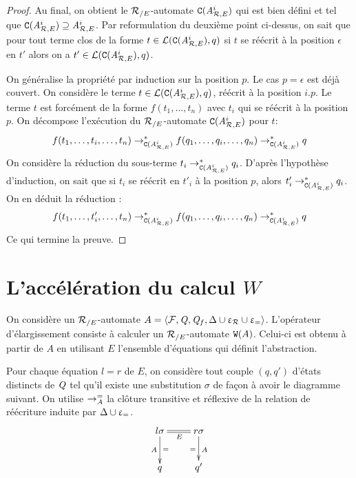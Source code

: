 \begin{proof}
  
  Au final, on obtient le ${\mathcal R_{/E}}$-automate $\mathtt{C}({\mathit A}_{\mathcal R,E}^i)$ qui est bien défini et tel que $\mathtt{C}({\mathit A}_{\mathcal R,E}^i) \supseteq {\mathit A}_{\mathcal R,E}^i$.
  Par reformulation du deuxième point ci-dessus, on sait que pour tout terme clos de la forme $t \in \mathcal{L}(\mathtt{C}({\mathit A}_{\mathcal R,E}^i),q)$ si $t$ se réécrit à la position $\epsilon$
  en $t'$ alors on a $t' \in \mathcal{L}(\mathtt{C}({\mathit A}_{\mathcal R,E}^i),q)$.

  On généralise la propriété par induction sur la position $p$. Le cas $p = \epsilon$ est déjà couvert.
  On considère le terme $t \in \mathcal{L}(\mathtt{C}({\mathit A}_{\mathcal R,E}^i),q)$, réécrit à la position $i.p$. Le terme $t$
  est forcément de la forme $f(t_1, \dots, t_n)$ avec $t_i$ qui se réécrit à la position $p$.
  On décompose l'exécution du ${\mathcal R_{/E}}$-automate $\mathtt{C}({\mathit A}_{\mathcal R,E}^i)$ pour $t$:
  \[ f(t_1, \dots,t_i, \dots,t_n) \rightarrow^*_{\mathtt{C}({\mathit A}_{\mathcal R,E}^i)} f(q_1, \dots,q_i, \dots,q_n) \rightarrow^*_{\mathtt{C}({\mathit A}_{\mathcal R,E}^i)} q \]
  On considère la réduction du sous-terme $t_i \rightarrow^*_{\mathtt{C}({\mathit A}_{\mathcal R,E}^i)} q_i$. D'après l'hypothèse d'induction,
  on sait que si $t_i$ se réécrit en $t'_i$ à la position $p$, alors $t'_i\rightarrow^*_{\mathtt{C}({\mathit A}_{\mathcal R,E}^i)} q_i$. 
  On en déduit la réduction :
  \[ f(t_1, \dots, t'_i, \dots,t_n) \rightarrow^*_{\mathtt{C}({\mathit A}_{\mathcal R,E}^i)} f(q_1, \dots,q_i, \dots,q_n) \rightarrow^*_{\mathtt{C}({\mathit A}_{\mathcal R,E}^i)} q \]
  Ce qui termine la preuve.
\end{proof}


\section{L'accélération du calcul $W$}

On considère un ${\mathcal R_{/E}}$-automate $A = \langle \mathcal{F}, \mathit Q, \mathit Q_f, \Delta \cup \upvarepsilon_{\mathcal R}
\cup \upvarepsilon_{=} \rangle$. L'opérateur d'élargissement consiste à calculer un 
${\mathcal R_{/E}}$-automate $\mathtt{W}(A)$. Celui-ci est obtenu à partir de $A$ en utilisant $E$
l'ensemble d'équations qui définit l'abstraction.

Pour chaque équation $l = r$ de $E$, on considère tout couple
$(q, q')$ d'états distincts de $\mathit Q$ tel qu'il existe une
substitution $\sigma$ de façon à avoir le diagramme suivant.
On utilise $\rightarrow^=_{A}$ la clôture transitive et réflexive
de la relation de réécriture induite par $\Delta \cup \upvarepsilon_{=}$.  
\[\xymatrix{
  l\sigma \ar@{=}[r]_{E}\ar[d]^{=}_{A} & r\sigma \ar[d]^{A}_{=}\\
  q & q'
}\]

